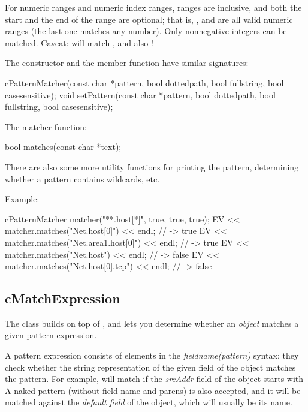 For numeric ranges and numeric index ranges, ranges are inclusive, and both
the start and the end of the range are optional; that is, ,
 and  are all valid numeric ranges (the last one
matches any number). Only nonnegative integers can be matched. Caveat:
 will match ,  and also !

The  constructor and the  member
function have similar signatures:

\begin{cpp}
cPatternMatcher(const char *pattern, bool dottedpath, bool fullstring,
                bool casesensitive);
void setPattern(const char *pattern, bool dottedpath, bool fullstring,
                bool casesensitive);
\end{cpp}

The matcher function:

\begin{cpp}
bool matches(const char *text);
\end{cpp}

There are also some more utility functions for printing the pattern,
determining whether a pattern contains wildcards, etc.

Example:

\begin{cpp}
cPatternMatcher matcher("**.host[*]", true, true, true);
EV << matcher.matches("Net.host[0]") << endl;  // -> true
EV << matcher.matches("Net.area1.host[0]") << endl;  // -> true
EV << matcher.matches("Net.host") << endl;  // -> false
EV << matcher.matches("Net.host[0].tcp") << endl;  // -> false
\end{cpp}


\subsection{cMatchExpression}

The  class builds on top of ,
and lets you determine whether an \textit{object} matches a given pattern
expression.

A pattern expression consists of elements in the
\textit{fieldname(pattern)} syntax; they check whether the string
representation of the given field of the object matches the pattern. For
example,  will match if the \textit{srcAddr}
field of the object starts with  A naked pattern (without
field name and parens) is also accepted, and it will be matched against the
\textit{default field} of the object, which will usually be its name.

